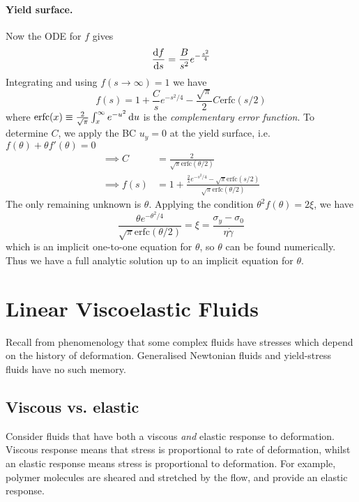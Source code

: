 \documentclass{jknotes}
\newcommand{\srate}{\dot{\gamma}}
\begin{document}
\paragraph{Yield surface.}
Now the ODE for $f$ gives
\begin{equation}
	\frac{\diffd f}{\diffd s} = \frac{B}{s^2} e^{-\frac{s^2}{4}}
\end{equation}
Integrating and using $f(s \to \infty) = 1$ we have
\begin{equation}
	f(s) = 1 + \frac{C}{s} e^{-s^2/4} - \frac{\sqrt{\pi}}{2}C
	\text{erfc}(s/2)
\end{equation}
where $\text{erfc}(x) \equiv \frac{2}{\sqrt{\pi}} \int_x^\infty e^{-u^2} \,
\diffd u$ is the \emph{complementary error function}. To determine $C$, we
apply the BC $u_y = 0$ at the yield surface, i.e. $f(\theta) + \theta
f'(\theta) = 0$
\begin{align}
	\implies C &= \frac{2}{\sqrt{\pi} \text{erfc}(\theta/2)} \\
	\implies f(s) &= 1 + \frac{\frac{2}{s} e^{-s^2/4} -
	\sqrt{\pi}\text{erfc}(s/2)}{\sqrt{\pi} \text{erfc}(\theta/2)}
\end{align}
The only remaining unknown is $\theta$. Applying the condition $\theta^2
f(\theta) = 2\xi$, we have
\begin{equation}
	\frac{\theta e^{-\theta^2/4}}{\sqrt{\pi}\text{erfc}(\theta/2)} = \xi =
	\frac{\sigma_y - \sigma_0}{\eta\srate}
\end{equation}
which is an implicit one-to-one equation for $\theta$, so $\theta$ can be
found numerically. Thus we have a full analytic solution up to an implicit
equation for $\theta$.

\section{Linear Viscoelastic Fluids}
Recall from phenomenology that some complex fluids have stresses which depend
on the history of deformation. Generalised Newtonian fluids and yield-stress
fluids have no such memory.

\subsection{Viscous vs. elastic}
Consider fluids that have both a viscous \emph{and} elastic response to
deformation. Viscous response means that stress is proportional to rate of
deformation, whilst an elastic response means stress is proportional to
deformation. For example, polymer molecules are sheared and stretched by the
flow, and provide an elastic response.
\end{document}
